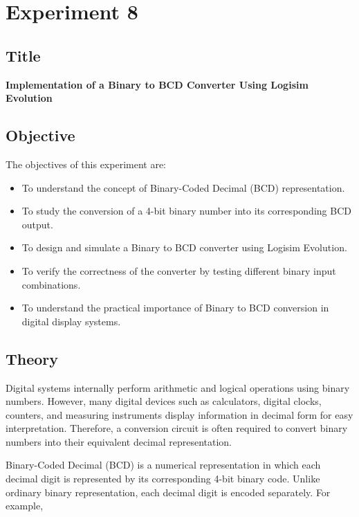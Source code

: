 \documentclass[12pt,a4paper]{article}
\begin{document}
\section{Experiment 8}

\subsection{Title}
\textbf{Implementation of a Binary to BCD Converter Using Logisim Evolution}

\subsection{Objective}

The objectives of this experiment are:

\begin{itemize}
    \item To understand the concept of Binary-Coded Decimal (BCD) representation.
    \item To study the conversion of a 4-bit binary number into its corresponding BCD output.
    \item To design and simulate a Binary to BCD converter using Logisim Evolution.
    \item To verify the correctness of the converter by testing different binary input combinations.
    \item To understand the practical importance of Binary to BCD conversion in digital display systems.
\end{itemize}

\subsection{Theory}

Digital systems internally perform arithmetic and logical operations using binary numbers. However, many digital devices such as calculators, digital clocks, counters, and measuring instruments display information in decimal form for easy interpretation. Therefore, a conversion circuit is often required to convert binary numbers into their equivalent decimal representation.

Binary-Coded Decimal (BCD) is a numerical representation in which each decimal digit is represented by its corresponding 4-bit binary code. Unlike ordinary binary representation, each decimal digit is encoded separately. For example,
\end{document}
